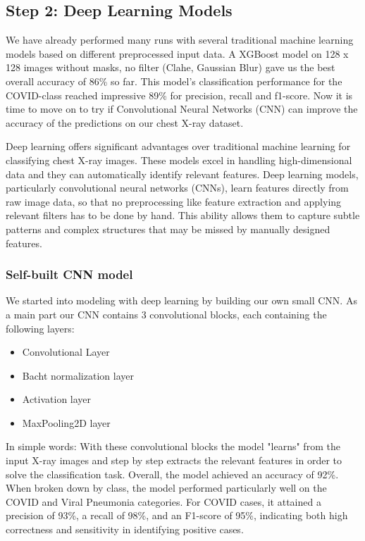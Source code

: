 \documentclass{article}
\begin{document}

\subsection{Step 2: Deep Learning Models}

We have already performed many runs with several traditional machine learning models based on different preprocessed input data. A XGBoost model on 128 x 128 images without masks, no filter (Clahe, Gaussian Blur) gave us the best overall accuracy of 86\% so far. This model's classification performance for the COVID-class reached impressive 89\% for precision, recall and f1-score. Now it is time to move on to try if Convolutional Neural Networks (CNN) can improve the accuracy of the predictions on our chest X-ray dataset. 

Deep learning offers significant advantages over traditional machine learning for classifying chest X-ray images. These models excel in handling high-dimensional data and they can automatically identify relevant features. Deep learning models, particularly convolutional neural networks (CNNs), learn features directly from raw image data, so that no preprocessing like feature extraction and applying relevant filters has to be done by hand. This ability allows them to capture subtle patterns and complex structures that may be missed by manually designed features.


\subsubsection{Self-built CNN model} 
We started into modeling with deep learning by building our own small CNN. As a main part our CNN contains 3 convolutional blocks, each containing the following layers: 
\begin{itemize}
    \item Convolutional Layer
    \item Bacht normalization layer
    \item Activation layer
    \item MaxPooling2D layer
\end{itemize}
In simple words: With these convolutional blocks the model "learns" from the input X-ray images and step by step extracts the relevant features in order to solve the classification task. 
Overall, the model achieved an accuracy of 92\%. When broken down by class, the model performed particularly well on the COVID and Viral Pneumonia categories. For COVID cases, it attained a precision of 93\%, a recall of 98\%, and an F1-score of 95\%, indicating both high correctness and sensitivity in identifying positive cases. 
\end{document}
